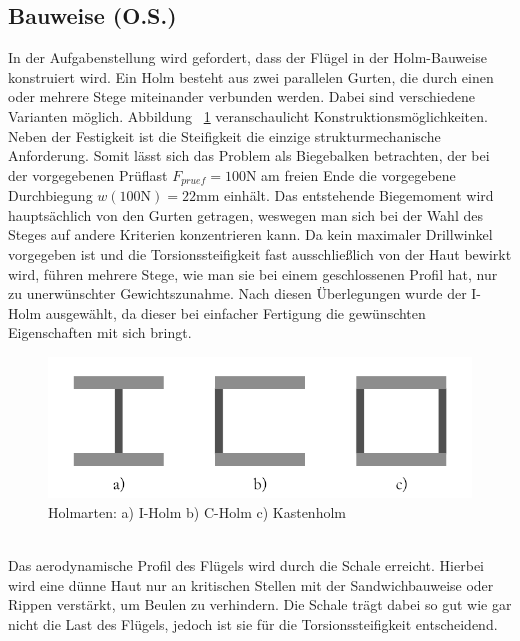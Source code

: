 \subsection{Bauweise (O.S.)}
In der Aufgabenstellung wird gefordert, dass der Flügel in der Holm-Bauweise konstruiert wird. Ein Holm besteht aus zwei parallelen Gurten, die durch einen oder mehrere Stege miteinander verbunden werden. Dabei sind verschiedene Varianten möglich. Abbildung ~\ref{fig: Holmarten} veranschaulicht Konstruktionsmöglichkeiten. Neben der Festigkeit ist die Steifigkeit die einzige strukturmechanische Anforderung. Somit lässt sich das Problem als Biegebalken betrachten, der bei der vorgegebenen Prüflast $ F_{pruef}=100\mathrm{N} $ am freien Ende die vorgegebene Durchbiegung $ w(100\mathrm{N})=22\mathrm{mm} $ einhält. Das entstehende Biegemoment wird hauptsächlich von den Gurten getragen, weswegen man sich bei der Wahl des Steges auf andere Kriterien konzentrieren kann. Da kein maximaler Drillwinkel vorgegeben ist und die Torsionssteifigkeit fast ausschließlich von der Haut bewirkt wird, führen mehrere Stege, wie man sie bei einem geschlossenen Profil hat, nur zu unerwünschter Gewichtszunahme. Nach diesen Überlegungen wurde der I-Holm ausgewählt, da dieser bei einfacher Fertigung die gewünschten Eigenschaften mit sich bringt.
\begin{figure}[h]
	\includegraphics[width=1.0\textwidth]{Bilder/Holmarten.png}
	\caption{Holmarten: a) I-Holm   b) C-Holm    c) Kastenholm}
	\label{fig: Holmarten}
\end{figure}\\ 
\noindent
Das aerodynamische Profil des Flügels wird durch die Schale erreicht. Hierbei wird eine dünne Haut nur an kritischen Stellen mit der Sandwichbauweise oder Rippen verstärkt, um Beulen zu verhindern. Die Schale trägt dabei so gut wie gar nicht die Last des Flügels, jedoch ist sie für die Torsionssteifigkeit entscheidend.
